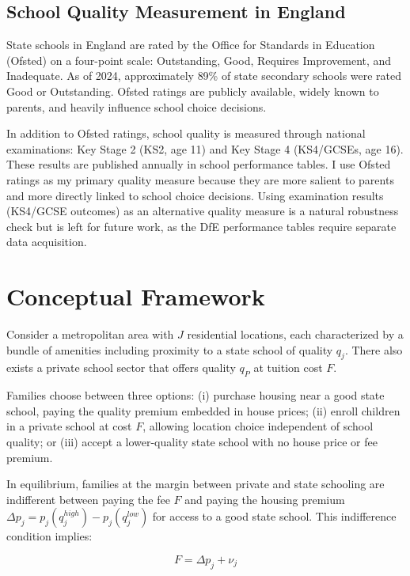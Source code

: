 \documentclass[12pt]{article}
\begin{document}
\subsection{School Quality Measurement in England}

State schools in England are rated by the Office for Standards in Education (Ofsted) on a four-point scale: Outstanding, Good, Requires Improvement, and Inadequate. As of 2024, approximately 89\% of state secondary schools were rated Good or Outstanding. Ofsted ratings are publicly available, widely known to parents, and heavily influence school choice decisions.

In addition to Ofsted ratings, school quality is measured through national examinations: Key Stage 2 (KS2, age 11) and Key Stage 4 (KS4/GCSEs, age 16). These results are published annually in school performance tables. I use Ofsted ratings as my primary quality measure because they are more salient to parents and more directly linked to school choice decisions. Using examination results (KS4/GCSE outcomes) as an alternative quality measure is a natural robustness check but is left for future work, as the DfE performance tables require separate data acquisition.


\section{Conceptual Framework}\label{sec:framework}

Consider a metropolitan area with $J$ residential locations, each characterized by a bundle of amenities including proximity to a state school of quality $q_j$. There also exists a private school sector that offers quality $q_P$ at tuition cost $F$.

Families choose between three options: (i) purchase housing near a good state school, paying the quality premium embedded in house prices; (ii) enroll children in a private school at cost $F$, allowing location choice independent of school quality; or (iii) accept a lower-quality state school with no house price or fee premium.

In equilibrium, families at the margin between private and state schooling are indifferent between paying the fee $F$ and paying the housing premium $\Delta p_j = p_j(q_j^{high}) - p_j(q_j^{low})$ for access to a good state school. This indifference condition implies:

\begin{equation}\label{eq:indifference}
    F = \Delta p_j + \nu_j
\end{equation}
\end{document}
